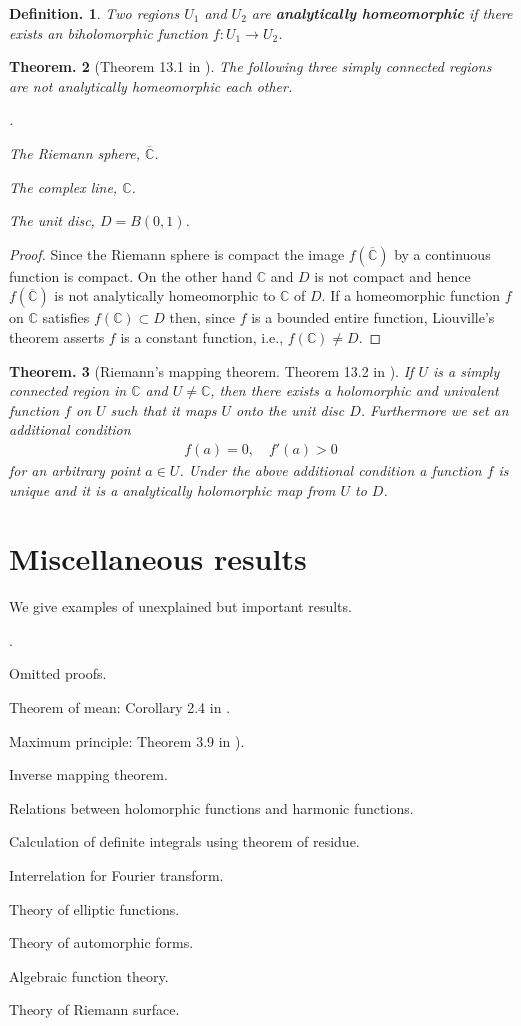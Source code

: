 \documentclass[openany, a4paper, oneside]{jsbook}
\newcounter{enum2}
\renewenvironment{enumerate}{%
\begin{list}%
{%
\arabic{enum2}.\ \,%
}%
{%
\usecounter{enum2}
\setlength{\itemindent}{0pt}%
\setlength{\leftmargin}{15pt}%
\setlength{\rightmargin}{0pt}%
\setlength{\labelsep}{0pt}%
\setlength{\labelwidth}{6pt}%
\setlength{\itemsep}{0pt}%
\setlength{\parsep}{0pt}%
\setlength{\listparindent}{0pt}%
}
}{%
\end{list}%
}
\theoremstyle{break}
\newtheorem{thm}{Theorem.}[section]
\theoremstyle{breakdefn}
\newtheorem{defn}[thm]{Definition.}
\newcommand{\bbC}{\mathbb{C}}
\newcommand{\riemannsphere}{\overline{\bbC}}
\begin{document}
\begin{defn}
 Two regions $U_1$ and $U_2$ are \textup{\textbf{analytically homeomorphic}} if
 there exists an biholomorphic function $f \colon U_1 \to U_2$.
\end{defn}
\begin{thm}[Theorem 13.1 in \cite{MitsuoSugiura2}]
 The following three simply connected regions are not analytically homeomorphic each other.
\begin{enumerate}
\item The Riemann sphere, $\riemannsphere$.
\item The complex line, $\bbC$.
\item The unit disc, $D = B (0, 1)$.
\end{enumerate}
\end{thm}
\begin{proof}
Since the Riemann sphere is compact the image $f (\riemannsphere)$ by a continuous function is compact.
On the other hand $\bbC$ and $D$ is not compact and hence $f (\riemannsphere)$ is not
analytically homeomorphic to $\bbC$ of $D$.
If a homeomorphic function $f$ on $\bbC$ satisfies $f (\bbC) \subset D$ then,
since $f$ is a bounded entire function, Liouville's theorem asserts $f$ is a constant function,
i.e., $f (\bbC) \neq D$.
\end{proof}
\begin{thm}[Riemann's mapping theorem. Theorem 13.2 in \cite{MitsuoSugiura2}]
 If $U$ is a simply connected region in $\bbC$ and $U \neq \bbC$, then
 there exists a holomorphic and univalent function $f$ on $U$ such that it maps $U$ onto the unit disc $D$.
 Furthermore we set an additional condition
 \begin{align}
  f (a) = 0, \quad f'(a) > 0
 \end{align}
 for an arbitrary point $a \in U$.
 Under the above additional condition a function $f$ is unique and it is a analytically holomorphic map from $U$ to $D$.
\end{thm}
\section{Miscellaneous results}


We give examples of unexplained but important results.
\begin{enumerate}
\item Omitted proofs.
\item Theorem of mean: Corollary 2.4 in \cite{MitsuoSugiura2}.
\item Maximum principle: Theorem 3.9 in \cite{MitsuoSugiura2}).
\item Inverse mapping theorem.
\item Relations between holomorphic functions and harmonic functions.
\item Calculation of definite integrals using theorem of residue.
\item Interrelation for Fourier transform.
\item Theory of elliptic functions.
\item Theory of automorphic forms.
\item Algebraic function theory.
\item Theory of Riemann surface.
\end{enumerate}
\end{document}
